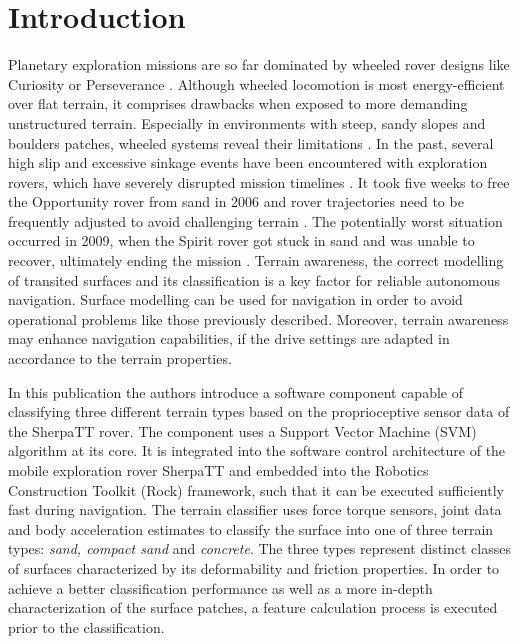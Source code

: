 \section{Introduction}

Planetary exploration missions are so far dominated by wheeled rover designs like Curiosity
or Perseverance \citep{moeller2021, welch2013}. Although wheeled locomotion is most energy-efficient
over flat terrain, it comprises drawbacks when exposed to more demanding unstructured
terrain. Especially in environments with steep, sandy slopes and boulders
patches, wheeled systems reveal their limitations \citep{kolvenbach2021}. In the past, several high slip and
excessive sinkage events have been encountered with exploration rovers, which have severely
disrupted mission timelines \citep{gonzalez2018}. It took five weeks to free the Opportunity
rover from sand in 2006 \citep{young2006} and rover trajectories need to be frequently adjusted to avoid
challenging terrain \citep{arvidson2017}. The potentially worst situation occurred in 2009, when the
Spirit rover got stuck in sand and was unable to recover, ultimately ending the mission
\citep{webster2009}. 
Terrain awareness, the correct modelling of transited surfaces and its classification is a key factor for reliable autonomous navigation. 
Surface modelling can be used for navigation in order to avoid operational problems like those previously described. 
Moreover, terrain awareness may enhance navigation capabilities, if the drive settings are adapted in accordance to the 
terrain properties.

In this publication the authors introduce a software component capable of classifying three different terrain types based on the proprioceptive sensor data of the SherpaTT rover. 
The component uses a Support Vector Machine (SVM) algorithm \citep{vapnik1992,cristianini2000} at its core. It is integrated into the software control architecture of the mobile exploration rover SherpaTT and embedded into the Robotics Construction Toolkit (Rock) framework, such that it can be executed sufficiently fast during navigation. The terrain classifier uses force torque sensors, joint data and body acceleration estimates to classify the surface into one of three terrain types: \emph{sand, compact sand} and \emph{concrete}.
The three types represent distinct classes of surfaces characterized by its deformability and friction properties. In order to achieve a better classification performance as well as a more in-depth characterization of the surface patches, a feature calculation process is executed prior to the classification. 

